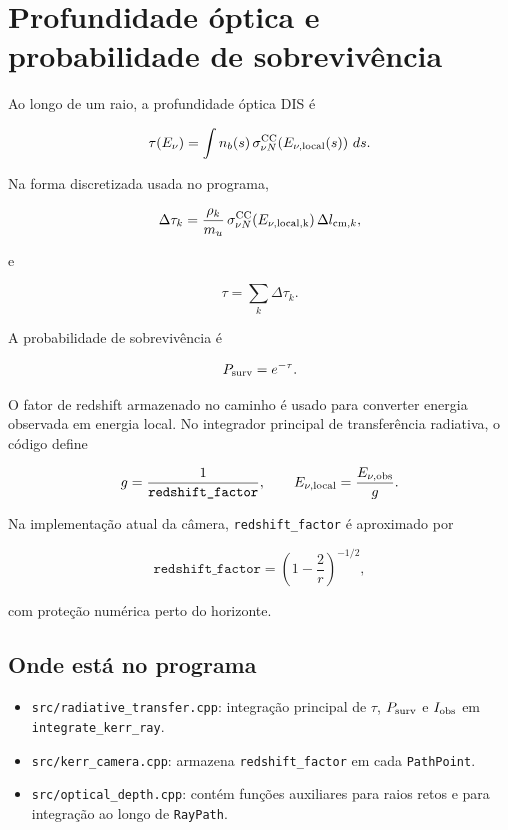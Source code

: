 \documentclass[11pt,a4paper]{article}
\begin{document}
\section{Profundidade óptica e probabilidade de sobrevivência}

Ao longo de um raio, a profundidade óptica DIS é

\begin{equation}
  \tau(E_\nu) =
  \int n_b(s)\,
  \sigma_{\nu N}^{\rm CC}\!\left(E_{\nu,\rm local}(s)\right)\,ds.
\end{equation}

Na forma discretizada usada no programa,

\begin{equation}
  \Delta\tau_k =
  \frac{\rho_k}{m_u}\,
  \sigma_{\nu N}^{\rm CC}(E_{\nu,\rm local,k})\,
  \Delta l_{{\rm cm},k},
\end{equation}

e

\begin{equation}
  \tau = \sum_k \Delta\tau_k.
\end{equation}

A probabilidade de sobrevivência é

\begin{equation}
  P_{\rm surv} = e^{-\tau}.
\end{equation}

O fator de redshift armazenado no caminho é usado para converter energia
observada em energia local. No integrador principal de transferência
radiativa, o código define

\begin{equation}
  g = \frac{1}{\texttt{redshift\_factor}},\qquad
  E_{\nu,\rm local} = \frac{E_{\nu,\rm obs}}{g}.
\end{equation}

Na implementação atual da câmera, \texttt{redshift\_factor} é aproximado por

\begin{equation}
  \texttt{redshift\_factor} =
  \left(1-\frac{2}{r}\right)^{-1/2},
\end{equation}

com proteção numérica perto do horizonte.

\subsection*{Onde está no programa}

\begin{itemize}
  \item \texttt{src/radiative\_transfer.cpp}: integração principal de
  $\tau$, $P_{\rm surv}$ e $I_{\rm obs}$ em \texttt{integrate\_kerr\_ray}.
  \item \texttt{src/kerr\_camera.cpp}: armazena \texttt{redshift\_factor}
  em cada \texttt{PathPoint}.
  \item \texttt{src/optical\_depth.cpp}: contém funções auxiliares para
  raios retos e para integração ao longo de \texttt{RayPath}.
\end{itemize}
\end{document}
